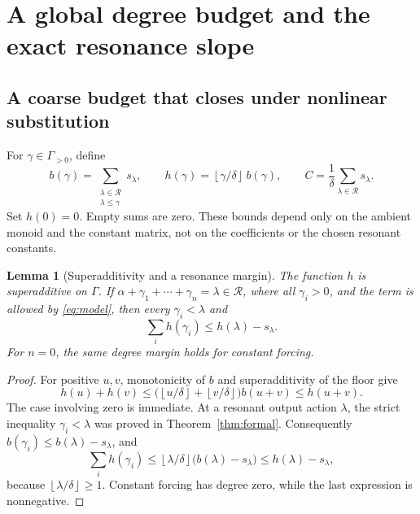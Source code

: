 \documentclass[11pt,a4paper]{article}
\numberwithin{equation}{section}
\newtheorem{lemma}[theorem]{Lemma}
\theoremstyle{definition}
\theoremstyle{remark}
\newcommand{\G}{\Gamma}
\newcommand{\Reson}{\mathcal R}
\newcommand{\floor}[1]{\left\lfloor #1\right\rfloor}
\begin{document}
\section{A global degree budget and the exact resonance slope}
\label{sec:slope}

\subsection{A coarse budget that closes under nonlinear substitution}
For \(\gamma\in\G_{>0}\), define
\begin{equation}\label{eq:budget}
 b(\gamma)=\sum_{\substack{\lambda\in\Reson\\\lambda\le\gamma}}
                  s_\lambda,
 \qquad h(\gamma)=\floor{\gamma/\delta}\,b(\gamma),
 \qquad C=\frac{1}{\delta}\sum_{\lambda\in\Reson}s_\lambda.
\end{equation}
Set \(h(0)=0\). Empty sums are zero. These bounds depend only on the
ambient monoid and the constant matrix, not on the coefficients or the
chosen resonant constants.

\begin{lemma}[Superadditivity and a resonance margin]\label{lem:budget}
The function \(h\) is superadditive on \(\G\). If
\(\alpha+\gamma_1+\cdots+\gamma_n=\lambda\in\Reson\), where all
\(\gamma_i>0\), and the term is allowed by \eqref{eq:model}, then
every \(\gamma_i<\lambda\) and
\begin{equation}\label{eq:res-margin}
 \sum_i h(\gamma_i)\le h(\lambda)-s_\lambda.
\end{equation}
For \(n=0\), the same degree margin holds for constant forcing.
\end{lemma}
\begin{proof}
For positive \(u,v\), monotonicity of \(b\) and superadditivity of the
floor give
\[
 h(u)+h(v)
 \le\bigl(\floor{u/\delta}+\floor{v/\delta}\bigr)b(u+v)
 \le h(u+v).
\]
The case involving zero is immediate. At a resonant output action
\(\lambda\), the strict inequality \(\gamma_i<\lambda\) was proved
in Theorem~\ref{thm:formal}. Consequently
\(b(\gamma_i)\le b(\lambda)-s_\lambda\), and
\[
 \sum_i h(\gamma_i)
 \le\floor{\lambda/\delta}\bigl(b(\lambda)-s_\lambda\bigr)
 \le h(\lambda)-s_\lambda,
\]
because \(\floor{\lambda/\delta}\ge1\). Constant forcing has degree
zero, while the last expression is nonnegative.
\end{proof}
\end{document}
